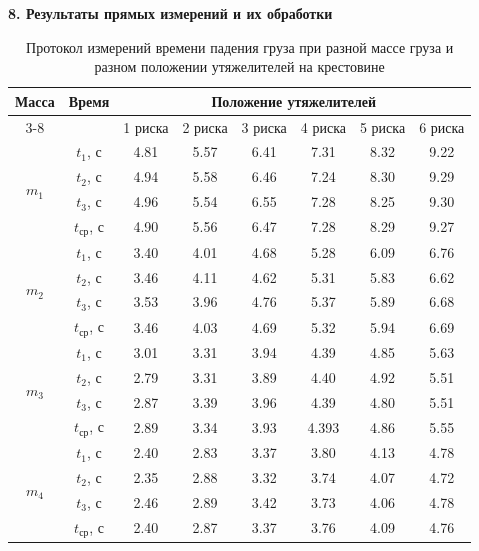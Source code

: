 \documentclass[14pt]{extreport}
\begin{document}
\noindent\textbf{8. Результаты прямых измерений и их обработки} 

\begin{table}[H]
\centering
\caption{Протокол измерений времени падения груза при разной массе груза и разном положении утяжелителей на крестовине}
\label{tab:direct104}
\begin{tabular}{|c|c|c|c|c|c|c|c|}
\hline
\multirow{2}{*}{\textbf{Масса}} & 
\multirow{2}{*}{\textbf{Время}} & 
\multicolumn{6}{c|}{\textbf{Положение утяжелителей}} \\ \cline{3-8}
& & 1 риска & 2 риска & 3 риска & 4 риска & 5 риска & 6 риска \\ \hline
\multirow{4}{*}{$ m_1 $}
 & $ t_1 $, с & 4.81 & 5.57 & 6.41 & 7.31 & 8.32 & 9.22 \\ \cline{2-8}
 & $ t_2 $, с & 4.94 & 5.58 & 6.46 & 7.24 & 8.30 & 9.29 \\ \cline{2-8}
 & $ t_3 $, с & 4.96 & 5.54 & 6.55 & 7.28 & 8.25 & 9.30 \\ \cline{2-8}
 & $ t_{\text{ср}} $, с & 4.90 & 5.56 & 6.47 & 7.28 & 8.29 & 9.27 \\ \hline
\multirow{4}{*}{$ m_2 $}
 & $ t_1 $, с & 3.40 & 4.01 & 4.68 & 5.28 & 6.09 & 6.76 \\ \cline{2-8}
 & $ t_2 $, с & 3.46 & 4.11 & 4.62 & 5.31 & 5.83 & 6.62 \\ \cline{2-8}
 & $ t_3 $, с & 3.53 & 3.96 & 4.76 & 5.37 & 5.89 & 6.68 \\ \cline{2-8}
 & $ t_{\text{ср}} $, с & 3.46 & 4.03 & 4.69 & 5.32 & 5.94 & 6.69 \\ \hline
\multirow{4}{*}{$ m_3 $}
 & $ t_1 $, с & 3.01 & 3.31 & 3.94 & 4.39 & 4.85 & 5.63 \\ \cline{2-8}
 & $ t_2 $, с & 2.79 & 3.31 & 3.89 & 4.40 & 4.92 & 5.51 \\ \cline{2-8}
 & $ t_3 $, с & 2.87 & 3.39 & 3.96 & 4.39 & 4.80 & 5.51 \\ \cline{2-8}
 & $ t_{\text{ср}} $, с & 2.89 & 3.34 & 3.93 & 4.393 & 4.86 & 5.55 \\ \hline
\multirow{4}{*}{$ m_4 $}
 & $ t_1 $, с & 2.40 & 2.83 & 3.37 & 3.80 & 4.13 & 4.78 \\ \cline{2-8}
 & $ t_2 $, с & 2.35 & 2.88 & 3.32 & 3.74 & 4.07 & 4.72 \\ \cline{2-8}
 & $ t_3 $, с & 2.46 & 2.89 & 3.42 & 3.73 & 4.06 & 4.78 \\ \cline{2-8}
 & $ t_{\text{ср}} $, с & 2.40 & 2.87 & 3.37 & 3.76 & 4.09 & 4.76 \\ \hline

\end{tabular}
\end{table}
\end{document}
